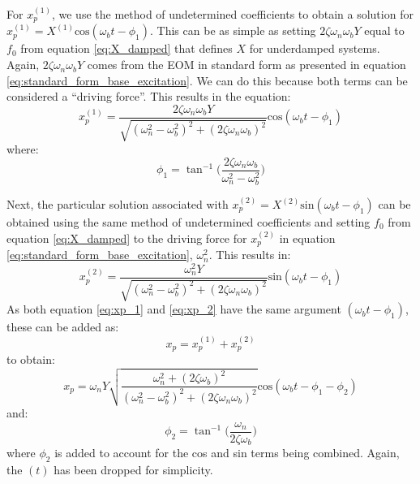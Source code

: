 \documentclass[12pt,letter]{article}
\begin{document}
		For $x_p^{(1)}$, we use the method of undetermined coefficients to obtain a solution for $x_p^{(1)} = X^{(1)}\text{cos}(\omega_b t - \phi_1)$. This can be as simple as setting $2 \zeta \omega_n \omega_b Y$ equal to $f_0$ from equation \ref{eq:X_damped} that defines $X$ for underdamped systems. Again, $2 \zeta \omega_n \omega_b Y$  comes from the EOM in standard form as presented in equation 	
		\ref{eq:standard_form_base_excitation}. We can do this because both terms can be considered a ``driving force''. This results in the equation:
		\begin{equation}
			x_p^{(1)} = \frac{2 \zeta \omega_n \omega_b Y}{\sqrt{(\omega_n^2 - \omega_b^2)^2 +  (2\zeta \omega_n \omega_b)^2}}  \text{cos}(\omega_b t - \phi_1)
			\label{eq:xp_1}
		\end{equation}
		where:
		\begin{equation}
			\phi_1 = \tan^{-1} \bigg(\frac{2\zeta \omega_n \omega_b}{\omega_n^2 - \omega_b^2}\bigg)
		\end{equation}
		
		Next, the particular solution associated with $x_p^{(2)} = X^{(2)} \text{sin}(\omega_b t - \phi_1)$ can be obtained using the same method of undetermined coefficients and setting $f_0$ from equation \ref{eq:X_damped} to the driving force for $x_p^{(2)}$ in equation  \ref{eq:standard_form_base_excitation}, $\omega_n^2$. This results in:
		\begin{equation}
			x_p^{(2)} = \frac{\omega_n^2 Y}{\sqrt{(\omega_n^2 - \omega_b^2)^2 +  (2\zeta \omega_n \omega_b)^2}}  \text{sin}(\omega_b t - \phi_1)
			\label{eq:xp_2}
		\end{equation}
		As both equation \ref{eq:xp_1} and \ref{eq:xp_2}  have the same argument $(\omega_b t - \phi_1)$, these can be added as:
		\begin{equation}
			x_p = 	x_p^{(1)} + x_p^{(2)}
		\end{equation}
		to obtain:
		\begin{equation}
			x_p = 	\omega_n Y   \sqrt{\frac{\omega_n^2 + (2 \zeta \omega_b)^2 }{(\omega_n^2 - \omega_b^2)^2 +  (2\zeta \omega_n \omega_b)^2} }  \text{cos}(\omega_bt - \phi_1 - \phi_2)
		\end{equation}
		and:
		\begin{equation}
			\phi_2 = \tan^{-1} \bigg(\frac{\omega_n}{2\zeta \omega_b}\bigg)
		\end{equation}
		where $\phi_2$ is added to account for the cos and sin terms being combined. Again, the $(t)$ has been dropped for simplicity. 
		
\end{document}
